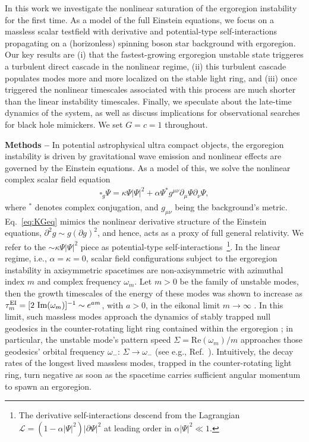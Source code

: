 \documentclass[aps,prl,notitlepage,superscriptaddress,twocolumn]{revtex4-1}
\newcommand{\red}[1]{{{#1}}}
\begin{document}
{In this work we investigate the nonlinear saturation of the ergoregion instability for the first time. As a model of the full Einstein equations, we focus on a massless scalar testfield with derivative and potential-type self-interactions propagating on a (horizonless) spinning boson star background with ergoregion. Our key results are (i) that the fastest-growing ergoregion unstable state triggeres a turbulent direct cascade in the nonlinear regime, (ii) this turbulent cascade populates modes more and more localized on the stable light ring, and (iii) once triggered the nonlinear timescales associated with this process are much shorter than the linear instability timescales.} Finally, we speculate about the late-time dynamics of the system, as well as discuss implications for observational searches for black hole mimickers. We set $G=c=1$ throughout.

\red{\textbf{Methods --} In potential astrophysical ultra compact objects, the ergoregion instability is driven by gravitational wave emission and nonlinear effects are governed by the Einstein equations. As a model of this, we} solve the nonlinear complex scalar field equation
\begin{align}
\square_g\Psi=\kappa \Psi |\Psi|^2+\alpha\Psi^* g^{\mu\nu}\partial_\mu\Psi\partial_\nu\Psi,
\label{eq:KGeq}
\end{align}
\red{where} ${}^*$ denotes complex conjugation, and $g_{\mu\nu}$ being the background's metric. Eq.~\eqref{eq:KGeq} mimics the nonlinear derivative structure of the Einstein equations, $\partial^2 g\sim g(\partial g)^2$, \red{and hence, acts as a proxy of full general relativity.} We refer to the $\sim\kappa \Psi |\Psi|^2$ piece as potential-type self-interactions~\footnote{\red{The derivative self-interactions descend from the Lagrangian $\mathcal{L}=(1-\alpha|\Psi|^2)|\partial\Psi|^2$ at leading order in $\alpha|\Psi|^2\ll 1$.}}. \red{In the linear regime, i.e., $\alpha=\kappa=0$, scalar field configurations subject to the ergoregion instability in axisymmetric spacetimes are non-axisymmetric with azimuthal index $m$ and complex frequency $\omega_m$. Let $m>0$ be the family of unstable modes, then the growth timescales of the energy of these modes was shown to increase as $\tau^{\rm EI}_m =[2 \ \text{Im}(\omega_m)]^{-1}\sim e^{a m}$, with $a>0$, in the eikonal limit $m\rightarrow\infty$ \cite{Comins:1978}. In this limit, such massless modes approach the dynamics of stably trapped null geodesics in the counter-rotating light ring contained within the ergoregion \cite{Comins:1978,Siemonsen:2025wib}; in particular, the unstable mode's pattern speed $\Sigma=\text{Re}(\omega_m)/m$ approaches those geodesics' orbital frequency $\omega_-$: $\Sigma\rightarrow \omega_-$ (see e.g., Ref.~\cite{Siemonsen:2025wib}). Intuitively, the decay rates of the longest lived massless modes, trapped in the counter-rotating light ring, turn negative as soon as the spacetime carries sufficient angular momentum to spawn an ergoregion.}
\end{document}
